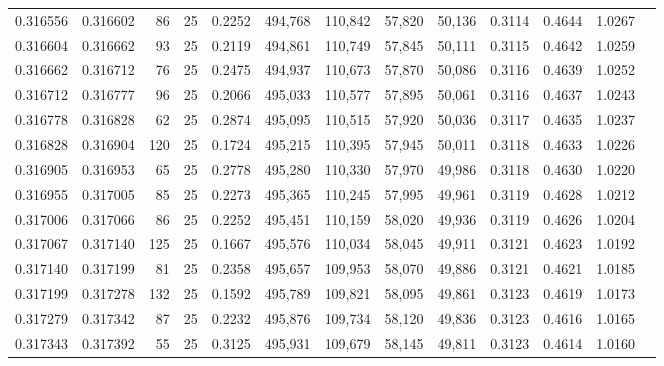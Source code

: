 \begin{tabular}{rrrrrrrrrrrrr}
0.316556 & 0.316602 &    86 &  25 &                                     0.2252 & 494,768 & 110,842 &  57,820 &  50,136 & 0.3114 & 0.4644 & 1.0267 \\
0.316604 & 0.316662 &    93 &  25 &                                     0.2119 & 494,861 & 110,749 &  57,845 &  50,111 & 0.3115 & 0.4642 & 1.0259 \\
0.316662 & 0.316712 &    76 &  25 &                                     0.2475 & 494,937 & 110,673 &  57,870 &  50,086 & 0.3116 & 0.4639 & 1.0252 \\
0.316712 & 0.316777 &    96 &  25 &                                     0.2066 & 495,033 & 110,577 &  57,895 &  50,061 & 0.3116 & 0.4637 & 1.0243 \\
0.316778 & 0.316828 &    62 &  25 &                                     0.2874 & 495,095 & 110,515 &  57,920 &  50,036 & 0.3117 & 0.4635 & 1.0237 \\
0.316828 & 0.316904 &   120 &  25 &                                     0.1724 & 495,215 & 110,395 &  57,945 &  50,011 & 0.3118 & 0.4633 & 1.0226 \\
0.316905 & 0.316953 &    65 &  25 &                                     0.2778 & 495,280 & 110,330 &  57,970 &  49,986 & 0.3118 & 0.4630 & 1.0220 \\
0.316955 & 0.317005 &    85 &  25 &                                     0.2273 & 495,365 & 110,245 &  57,995 &  49,961 & 0.3119 & 0.4628 & 1.0212 \\
0.317006 & 0.317066 &    86 &  25 &                                     0.2252 & 495,451 & 110,159 &  58,020 &  49,936 & 0.3119 & 0.4626 & 1.0204 \\
0.317067 & 0.317140 &   125 &  25 &                                     0.1667 & 495,576 & 110,034 &  58,045 &  49,911 & 0.3121 & 0.4623 & 1.0192 \\
0.317140 & 0.317199 &    81 &  25 &                                     0.2358 & 495,657 & 109,953 &  58,070 &  49,886 & 0.3121 & 0.4621 & 1.0185 \\
0.317199 & 0.317278 &   132 &  25 &                                     0.1592 & 495,789 & 109,821 &  58,095 &  49,861 & 0.3123 & 0.4619 & 1.0173 \\
0.317279 & 0.317342 &    87 &  25 &                                     0.2232 & 495,876 & 109,734 &  58,120 &  49,836 & 0.3123 & 0.4616 & 1.0165 \\
0.317343 & 0.317392 &    55 &  25 &                                     0.3125 & 495,931 & 109,679 &  58,145 &  49,811 & 0.3123 & 0.4614 & 1.0160 \\

\end{tabular}
